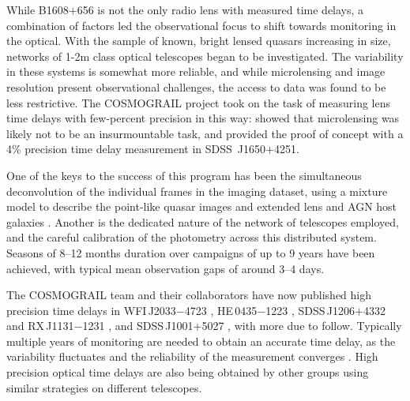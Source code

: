 While B1608$+$656 is not the only radio lens with measured time
delays, a combination of factors led the observational focus to shift
towards monitoring in the optical. With the sample of known, bright
lensed quasars increasing in size, networks of 1-2m class optical
telescopes began to be investigated. The variability in these systems
is somewhat more reliable, and while microlensing and image resolution
present observational challenges, the access to data was found to be
less restrictive. The COSMOGRAIL project \citep{Cou++05} took on the
task of measuring lens time delays with few-percent precision in this
way:
\citet{Eig++05} showed that microlensing was likely not to be an
insurmountable task, and \citet{Vui++07} provided the proof of concept
with a 4\% precision time delay measurement in SDSS\ J1650$+$4251.

One of the keys to the success of this program has been the simultaneous
deconvolution of the individual frames in the imaging dataset, using  a
mixture model to describe the point-like quasar images and extended lens
and AGN host galaxies \citep{MCS98}.  Another is the dedicated nature of
the network of telescopes employed, and the  careful calibration of the
photometry across this distributed system. Seasons of 8--12 months
duration over campaigns of up to 9 years have been achieved, with
typical mean observation gaps of around 3--4 days.

The COSMOGRAIL team and their collaborators have now published high
precision time delays in WFI\,J2033$-$4723 \citep[][3.8\%]{Vui++08},
HE\,0435$-$1223
\citep[][5.6\%]{Cou++11}, SDSS\,J1206$+$4332 \citep[][2.7\%]{Eul++13}
and  RX\,J1131$-$1231 \citep[][1.5\%]{Tew++13}, and SDSS\,J1001$+$5027
\citep[][2.8\%]{RK++13}, with more due to follow.  Typically multiple
years of monitoring are needed to obtain an accurate  time delay, as the
variability fluctuates and the reliability of the  measurement converges
\citep[see the discussion in e.g.\ ][]{Tew++13}. High precision optical time delays are also being obtained by other groups \citep{Poi++07a,Foh++07,Dah++15} using similar strategies on different telescopes.

